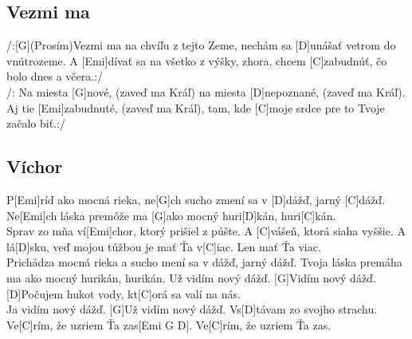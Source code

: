 \documentclass[10pt]{article}
\begin{document}
\begin{Large}
\begin{minipage}{\textwidth}
\subsection{Vezmi ma}
\begin{multicols*}{2}
\begin{guitar}
	/:[G](Prosím)Vezmi ma na chvíľu z tejto Zeme,
	nechám sa [D]unášať vetrom do vnútrozeme.
	A [Emi]dívať sa na všetko z výšky, zhora,
	chcem [C]zabudnúť, čo bolo dnes a včera.:/
	\\
	/: Na miesta [G]nové, (zaveď ma Kráľ)
	na miesta [D]nepoznané, (zaveď ma Kráľ).
	Aj tie [Emi]zabudnuté, (zaveď ma Kráľ),
	tam, kde [C]moje srdce pre to Tvoje začalo biť.:/
\end{guitar}
\end{multicols*}
\end{minipage}


\begin{minipage}{\textwidth}
\subsection{Víchor}
\begin{multicols*}{2}
	\begin{guitar}
		P[Emi]ríď ako mocná rieka,
		ne[G]ch sucho zmení sa v [D]dážď, jarný [C]dážď.
		Ne[Emi]ch láska premôže ma
		[G]ako mocný huri[D]kán, huri[C]kán.
		\\
		Sprav zo mňa ví[Emi]chor,
		ktorý prišiel z púšte.
		A [C]vášeň, ktorá siaha vyššie.
		A lá[D]sku, veď mojou túžbou je mať Ťa v[C]iac.
		Len mať Ťa viac.
		\\
		Prichádza mocná rieka
		a sucho mení sa v dážď, jarný dážď.
		Tvoja láska premáha ma
		ako mocný hurikán, hurikán.
		\columnbreak
		[Emi]Už vidím nový dážď.
		[G]Vidím nový dážď.
		[D]Počujem hukot vody,
		kt[C]orá sa valí na nás.
		\\
		[Emi]Ja vidím nový dážď.
		[G]Už vidím nový dážď.
		Vs[D]távam zo svojho strachu.
		Ve[C]rím, že uzriem Ťa zas[Emi G D]. 
		Ve[C]rím, že uzriem Ťa zas.
	\end{guitar}
\end{multicols*}
\end{minipage}


\begin{minipage}{\textwidth}

\end{minipage}
\end{Large}
\end{document}
